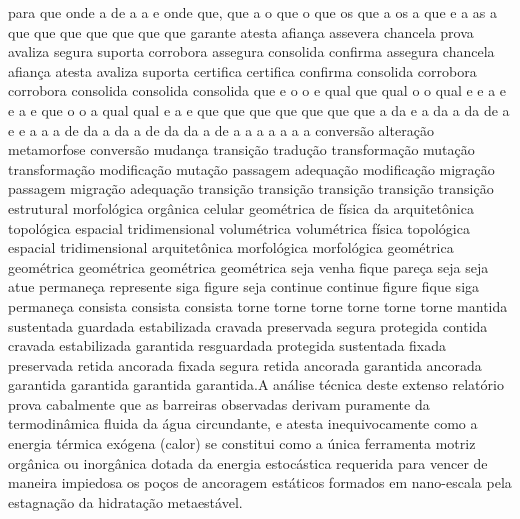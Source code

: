 para que onde a de a a e onde que, que a o que o que os que a os a que e a as a que que que que que que que garante atesta afiança assevera chancela prova avaliza segura suporta corrobora assegura consolida confirma assegura chancela afiança atesta avaliza suporta certifica certifica confirma consolida corrobora corrobora consolida consolida consolida que e o o e qual que qual o o qual e e a e e a e que o o a qual qual e a e que que que que que que que a da e a da a da de a e e a a a de da a da a de da da a de a a a a a a a conversão alteração metamorfose conversão mudança transição tradução transformação mutação transformação modificação mutação passagem adequação modificação migração passagem migração adequação transição transição transição transição transição estrutural morfológica orgânica celular geométrica de física da arquitetônica topológica espacial tridimensional volumétrica volumétrica física topológica espacial tridimensional arquitetônica morfológica morfológica geométrica geométrica geométrica geométrica geométrica seja venha fique pareça seja seja atue permaneça represente siga figure seja continue continue figure fique siga permaneça consista consista consista torne torne torne torne torne torne mantida sustentada guardada estabilizada cravada preservada segura protegida contida cravada estabilizada garantida resguardada protegida sustentada fixada preservada retida ancorada fixada segura retida ancorada garantida ancorada garantida garantida garantida garantida.A análise técnica deste extenso relatório prova cabalmente que as barreiras observadas derivam puramente da termodinâmica fluida da água circundante, e atesta inequivocamente como a energia térmica exógena (calor) se constitui como a única ferramenta motriz orgânica ou inorgânica dotada da energia estocástica requerida para vencer de maneira impiedosa os poços de ancoragem estáticos formados em nano-escala pela estagnação da hidratação metaestável.

